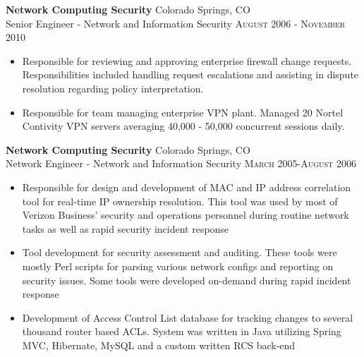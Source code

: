 \textbf{Network Computing Security} \hfill Colorado Springs, CO\\
Senior Engineer - Network and Information Security \hfill \textsc{August 2006} - \textsc{November 2010}

\begin{itemize}
\item
Responsible for reviewing and approving enterprise firewall change requests.
Responsibilities included handling request escalations and assisting in dispute
resolution regarding policy interpretation.

\item
Responsible for team managing enterprise VPN plant.  Managed 20 Nortel Contivity VPN servers
averaging 40,000 - 50,000 concurrent sessions daily.
\end{itemize}


\textbf{Network Computing Security} \hfill Colorado Springs, CO\\
Network Engineer - Network and Information Security \hfill \textsc{March 2005-August 2006}

\begin{itemize}
\item
Responsible for design and development of MAC and IP address correlation tool
for real-time IP ownership resolution.  This tool was used by most of Verizon
Business’ security and operations personnel during routine network tasks as well
as rapid security incident response

\item
Tool development for security assessment and auditing. These tools were mostly
Perl scripts for parsing various network configs and reporting on security
issues.  Some tools were developed on-demand during rapid incident response

\item 
Development of Access Control List database for tracking changes to several
thousand router based ACLs. System was written in Java utilizing Spring MVC,
Hibernate, MySQL and a custom written RCS back-end
\end{itemize}

